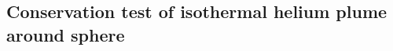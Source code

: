 \documentclass[12pt]{article}
\begin{document}
\subsection{Conservation test of isothermal helium plume around sphere}






%
%
%
%
%
%
%
%
\end{document}
